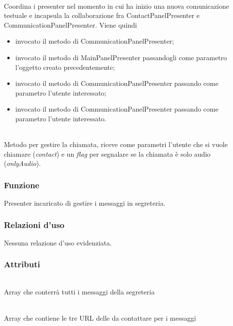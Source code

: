 \begin{description}
\item{}\\
Coordina i presenter nel momento in cui ha inizio una nuova comunicazione testuale e incapsula la collaborazione fra ContactPanelPresenter e CommunicationPanelPresenter. Viene quindi
\begin{itemize}
\item invocato il metodo  di CommunicationPanelPresenter;
\item invocato il metodo  di MainPanelPresenter passandogli come parametro l'oggetto creato precedentemente;
\item invocato il metodo  di CommunicationPanelPresenter passando come parametro l'utente interessato;
\item invocato il metodo  di CommunicationPanelPresenter passando come parametro l'utente interessato.
\end{itemize} 

\item{}\\
Metodo per gestire la chiamata, riceve come parametri l'utente che si vuole chiamare (\textit{contact}) e un \textit{flag} per segnalare se la chiamata è solo audio (\textit{onlyAudio}).

\end{description}


\subsubsection*{Funzione}
Presenter incaricato di gestire i messaggi in segreteria.

\subsubsection*{Relazioni d'uso}
Nessuna relazione d'uso evidenziata.

\subsubsection*{Attributi}
\begin{description}
\item{}\\
Array che conterrà tutti i messaggi della segreteria
\item{}\\
Array che contiene le tre URL delle  da contattare per i messaggi
\end{description}

